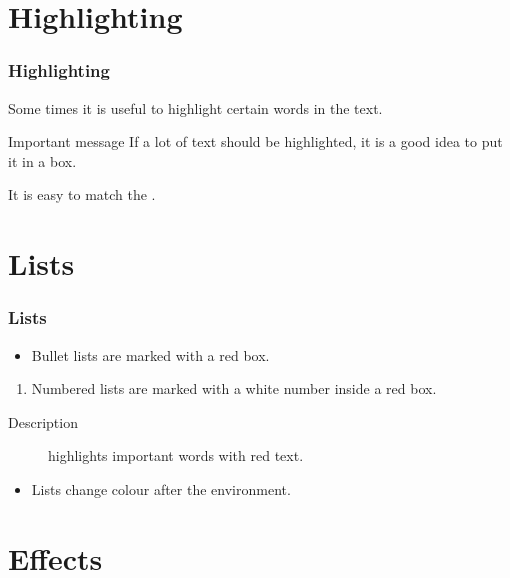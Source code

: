 \documentclass[UKenglish]{beamer}
\begin{document}
\section{Highlighting}

\begin{frame}
    \frametitle{Highlighting}

    Some times it is useful to \alert{highlight} certain words in the text.

    \begin{alertblock}{Important message}
        If a lot of text should be \alert{highlighted}, it is a good idea to put it in a box.
    \end{alertblock}

    It is easy to match the .
\end{frame}

\section{Lists}

\begin{frame}
    \frametitle{Lists}

    \begin{itemize}
        \item
        Bullet lists are marked with a red box.
    \end{itemize}

    \begin{enumerate}
        \item
        Numbered lists are marked with a white number inside a red box.
    \end{enumerate}

    \begin{description}
        \item[Description] highlights important words with red text.
    \end{description}

    \begin{example}
        \begin{itemize}
            \item
            Lists change colour after the environment.
        \end{itemize}
    \end{example}
\end{frame}

\section{Effects}
\end{document}
